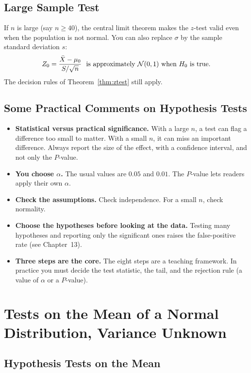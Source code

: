 \subsection{Large Sample Test}

If $n$ is large (say $n\ge40$), the central limit theorem makes the $z$-test valid even when the population is not normal. You can also replace $\sigma$ by the sample standard deviation $s$:
\[ Z_0=\frac{\bar{X}-\mu_0}{S/\sqrt n}\ \text{ is approximately }\mathcal{N}(0,1)\text{ when }H_0\text{ is true}. \]
The decision rules of Theorem~\ref{thm:ztest} still apply.

\subsection{Some Practical Comments on Hypothesis Tests}\label{sec:practical}

\begin{itemize}
  \item \textbf{Statistical versus practical significance.} With a large $n$, a test can flag a difference too small to matter. With a small $n$, it can miss an important difference. Always report the size of the effect, with a confidence interval, and not only the $P$-value.
  \item \textbf{You choose $\alpha$.} The usual values are $0.05$ and $0.01$. The $P$-value lets readers apply their own $\alpha$.
  \item \textbf{Check the assumptions.} Check independence. For a small $n$, check normality.
  \item \textbf{Choose the hypotheses before looking at the data.} Testing many hypotheses and reporting only the significant ones raises the false-positive rate (see Chapter~13).
  \item \textbf{Three steps are the core.} The eight steps are a teaching framework. In practice you must decide the test statistic, the tail, and the rejection rule (a value of $\alpha$ or a $P$-value).
\end{itemize}

\section{Tests on the Mean of a Normal Distribution, Variance Unknown}

\subsection{Hypothesis Tests on the Mean}

